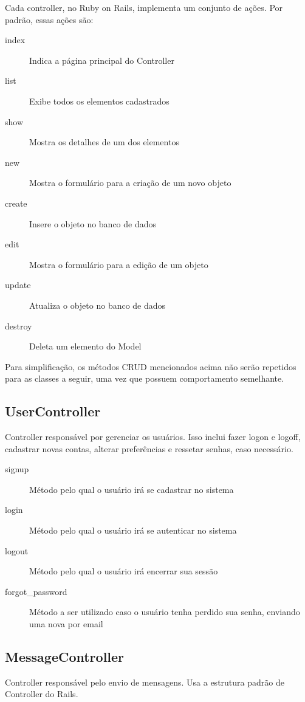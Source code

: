 \documentclass[11pt]{article}
\begin{document}
Cada controller, no Ruby on Rails, implementa um conjunto de ações. Por padrão, essas ações são:

\begin{description}
	\item[index] Indica a página principal do Controller
	\item[list] Exibe todos os elementos cadastrados
	\item[show] Mostra os detalhes de um dos elementos
	\item[new] Mostra o formulário para a criação de um novo objeto
	\item[create] Insere o objeto no banco de dados
	\item[edit] Mostra o formulário para a edição de um objeto
	\item[update] Atualiza o objeto no banco de dados
	\item[destroy] Deleta um elemento do Model
\end{description}

Para simplificação, os métodos CRUD mencionados acima não serão repetidos para as classes a
seguir, uma vez que possuem comportamento semelhante.

\subsection{UserController}

Controller responsável por gerenciar os usuários. Isso inclui fazer logon e logoff, cadastrar novas
contas, alterar preferências e ressetar senhas, caso necessário.

\begin{description}
	\item[signup] Método pelo qual o usuário irá se cadastrar no sistema
	\item[login] Método pelo qual o usuário irá se autenticar no sistema
	\item[logout] Método pelo qual o usuário irá encerrar sua sessão
	\item[forgot\_password] Método a ser utilizado caso o usuário tenha perdido sua senha, enviando uma nova por email
\end{description}

\subsection{MessageController}

Controller responsável pelo envio de mensagens. Usa a estrutura padrão de Controller do Rails.
\end{document}
